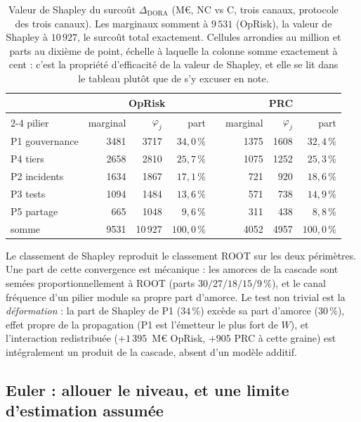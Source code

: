 \begin{table}[htbp]\centering\small
\renewcommand{\arraystretch}{1.25}
\begin{tabular}{@{}l rrr c rrr@{}}
\toprule
& \multicolumn{3}{c}{OpRisk} & & \multicolumn{3}{c}{PRC} \\
\cmidrule{2-4}\cmidrule{6-8}
pilier & marginal & $\varphi_j$ & part & & marginal & $\varphi_j$ & part \\
\midrule
P1 gouvernance & 3481 & 3717 & $34{,}0\,\%$ & & 1375 & 1608 & $32{,}4\,\%$ \\
P4 tiers       & 2658 & 2810 & $25{,}7\,\%$ & & 1075 & 1252 & $25{,}3\,\%$ \\
P2 incidents   & 1634 & 1867 & $17{,}1\,\%$ & &  721 &  920 & $18{,}6\,\%$ \\
P3 tests       & 1094 & 1484 & $13{,}6\,\%$ & &  571 &  738 & $14{,}9\,\%$ \\
P5 partage     &  665 & 1048 &  $9{,}6\,\%$ & &  311 &  438 &  $8{,}8\,\%$ \\
\midrule
somme          & 9531 & 10\,927 & $100{,}0\,\%$ & & 4052 & 4957 & $100{,}0\,\%$ \\
\bottomrule
\end{tabular}
\caption{Valeur de Shapley du surcoût $\Delta_{\text{DORA}}$ (M\euro, NC vs C, trois canaux,
protocole des trois canaux). Les marginaux somment à $9\,531$ (OpRisk), la valeur de
Shapley à $10\,927$, le surcoût total exactement. Cellules arrondies au million et parts au
dixième de point, échelle à laquelle la colonne somme exactement à cent : c'est la propriété
d'efficacité de la valeur de Shapley, et elle se lit dans le tableau plutôt que de s'y
excuser en note.}
\label{tab:shapley}
\end{table}

Le classement de Shapley reproduit le classement ROOT sur les deux périmètres. Une part de
cette convergence est mécanique : les amorces de la cascade sont semées
proportionnellement à ROOT (parts $30/27/18/15/9\,\%$),
et le canal fréquence d'un pilier
module sa propre part d'amorce. Le test non trivial est la \emph{déformation} : la part de
Shapley de P1 ($34\,\%$) excède sa part d'amorce ($30\,\%$), effet propre de la propagation
(P1 est l'émetteur le plus fort de $W$), et l'interaction redistribuée ($+1\,395$~M\euro{}
OpRisk, $+905$ PRC à cette graine) est intégralement un produit de la cascade, absent d'un
modèle additif.

\subsection{Euler : allouer le niveau, et une limite d'estimation assumée}

